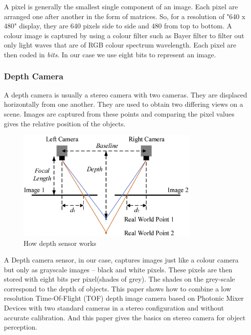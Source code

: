 A pixel is generally the smallest single component of an image. Each pixel are arranged
one after another in the form of matrices. So, for a resolution of "640 x 480" display,
they are 640 pixels side to side and 480 from top to bottom.
A colour image is captured by using a colour filter such as Bayer filter to filter out
only light waves that are of RGB colour spectrum wavelength. Each pixel are then coded
in \textit{bits}. In our case we use eight bits to represent an image.

\subsubsection*{Depth Camera}
A depth camera is usually a stereo camera with two cameras. They are displaced
horizontally from one another. They are used to obtain two differing views on a scene.
Images are captured from these points and comparing the pixel values gives the relative position of
the objects.

\begin{figure}[h]
	\centering
    \includegraphics[width=0.8\textwidth,
    scale=0.1]{figures/inkscape/depthsensor2.png}
    \caption{How depth sensor works}
    \label{fig:depthcamera}
\end{figure}
A Depth camera sensor, in our case, captures images just like
a colour camera but only as grayscale images -- black and white pixels. These pixels are
then stored with eight bits per pixel(shades of grey). The shades on the grey-scale correspond to the depth of objects.
This paper \cite{depthsensorpaper1} shows how to combine  a  low  resolution
Time-Of-Flight  (TOF)  depth  image  camera based on Photonic Mixer Devices with two
standard cameras in a stereo configuration and without accurate calibration. And this
paper \cite{depthsensorpaper2} gives the basics on stereo camera for object perception.

